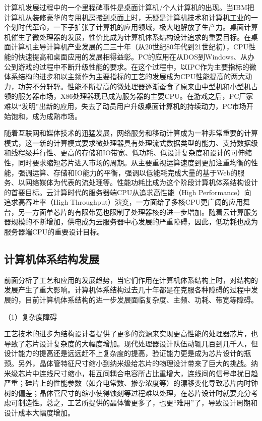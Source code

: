 \documentclass[]{ctexbook}
\begin{document}
计算机发展过程中的一个里程碑事件是桌面计算机/个人计算机的出现。当IBM把计算机从装修豪华的专用机房搬到桌面上时，无疑是计算机技术和计算机工业的一个划时代革命，一下子扩张了计算机的应用领域，极大地解放了生产力。桌面计算机催生了微处理器的发展，性价比成为计算机体系结构设计追求的重要目标。在桌面计算机主导计算机产业发展的二三十年（从20世纪80年代到21世纪初），CPU性能的快速提高和桌面应用的发展相得益彰。PC的应用在从DOS到Windows、从办公到游戏的过程中不断升级性能的要求。在这个过程中，以IPC作为主要指标的微体系结构的进步和以主频作为主要指标的工艺的发展成为CPU性能提高的两大动力，功劳不分轩轾。性能不断提高的微处理器逐渐蚕食了原来由中型机和小型机占领的服务器市场，X86处理器现已成为服务器的主要CPU。在游戏之后，PC厂家难以``发明''出新的应用，失去了动员用户升级桌面计算机的持续动力，PC市场开始饱和，成为成熟市场。

随着互联网和媒体技术的迅猛发展，网络服务和移动计算成为一种非常重要的计算模式，这一新的计算模式要求微处理器具有处理流式数据类型的能力、支持数据级和线程级并行性、更高的存储和IO带宽、低功耗、低设计复杂度和设计的可伸缩性，同时要求缩短芯片进入市场的周期。从主要重视运算速度到更加注重均衡的性能，强调运算、存储和IO能力的平衡，强调以低能耗完成大量的基于Web的服务、以网络媒体为代表的流处理等。性能功耗比成为这个阶段计算机体系结构设计的首要目标。云计算时代的服务器端CPU从追求高性能（High Performance）向追求高吞吐率（High Throughput）演变，一方面给了多核CPU更广阔的应用舞台，另一方面单芯片的有限带宽也限制了处理器核的进一步增加。随着云计算服务器规模的不断增加，供电成为云服务器中心发展的严重障碍，因此，低功耗也成为服务器端CPU的重要设计目标。

\hypertarget{ux8ba1ux7b97ux673aux4f53ux7cfbux7ed3ux6784ux53d1ux5c55}{%
\subsection{计算机体系结构发展}\label{ux8ba1ux7b97ux673aux4f53ux7cfbux7ed3ux6784ux53d1ux5c55}}

前面分析了工艺和应用的发展趋势，当它们作用在计算机体系结构上时，对结构的发展产生了重大影响。计算机体系结构过去几十年都是在克服各种障碍的过程中发展的，目前计算机体系结构的进一步发展面临复杂度、主频、功耗、带宽等障碍。

（1）复杂度障碍

工艺技术的进步为结构设计者提供了更多的资源来实现更高性能的处理器芯片，也导致了芯片设计复杂度的大幅度增加。现代处理器设计队伍动辄几百到几千人，但设计能力的提高还是远远赶不上复杂度的提高，验证能力更是成为芯片设计的瓶颈。另外，晶体管特征尺寸缩小到纳米级给芯片的物理设计带来了巨大的挑战。纳米级芯片中连线尺寸缩小，相互间耦合电容所占比重增大，连线间的信号串扰日趋严重；硅片上的性能参数（如介电常数、掺杂浓度等）的漂移变化导致芯片内时钟树的偏差；晶体管尺寸的缩小使得蚀刻等过程难以处理，在芯片设计时就要充分考虑可制造性。总之，工艺所提供的晶体管更多了，也更``难用''了，导致设计周期和设计成本大幅度增加。
\end{document}
